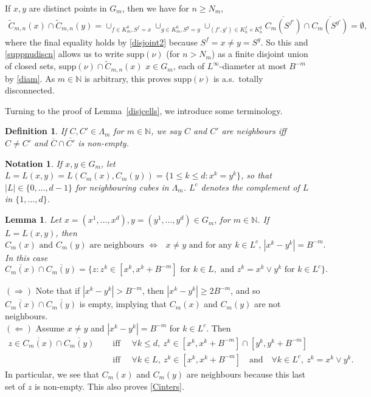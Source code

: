 \documentclass[12pt]{article}
\makeatletter
\renewenvironment{proof}[1][\proofname]{%
\par\pushQED{\qed}\normalfont%
\topsep6\p@\@plus6\p@\relax
\trivlist\item[\hskip\labelsep\bfseries#1\@addpunct{.}]%
\ignorespaces
}{%
\popQED\endtrivlist\@endpefalse
}
\numberwithin{theorem}{section}
\newtheorem{lemma}[theorem]{Lemma}
\theoremstyle{def}
\newtheorem*{definition}{Definition}
\newtheorem*{notation}{Notation}
\numberwithin{equation}{section}
\newcommand{\N}{\mathbb{N}}
\newcommand{\supp}{\mathrm{supp}}
\makeatother
\begin{document}
\begin{proof}[Proof of Theorem~\ref{thm:totdisc}]
If $x,y$ are distinct points in $G_m$, then we have for $n\ge N_m$,
\begin{align*}\widetilde C_{m,n}(x)\cap\widetilde C_{m,n}(y)=\cup_{f\in K_m^0,S^f=x}\cup_{g\in K^0_m,S^g=y}\cup_{(f',g')\in K^f_n\times K^g_n} \overline{C_m(S^{f'})}\cap\overline{C_m(S^{g'})}=\emptyset,
\end{align*}
where the final equality holds by \eqref{disjoint2} because $S^f=x\neq y=S^g$. So this and \eqref{suppnudiscn} allows us to write $\supp(\nu)$ (for $n>N_m$) as a finite disjoint union of closed sets, $\supp(\nu)\cap \widetilde C_{m,n}(x)$ $x\in G_m$, each of $L^\infty$-diameter at most $B^{-m}$ by \eqref{diam}.  
As $m\in\N$ is arbitrary, this proves $\supp(\nu)$ is a.s.\ totally disconnected.
\end{proof} 

Turning to the proof of Lemma~\ref{disjcells}, we introduce some terminology. 

\begin{definition} If $C,C'\in \Lambda_m$ for $m\in\N$, we say $C$ and $C'$ are neighbours iff $C\neq C'$ and $\overline{C}\cap\overline{C'}$ is non-empty.
\end{definition} 

\begin{notation}  If $x,y\in G_m$, let $L=L(x,y)=L(C_m(x),C_m(y))=\{1\le k\le d:x^k=y^k\}$, so that $|L|\in\{0,\dots,d-1\}$ for neighbouring cubes in $\Lambda_m$. $L^c$ denotes the complement of $L$ in $\{1,\dots,d\}$.
\end{notation}

\begin{lemma}\label{ellneighb} Let $x=(x^1,\dots,x^d), y=(y^1,\dots,y^d)\in G_m$, for $m\in\N$. If $L=L(x,y)$, then
\[\text{$C_m(x)$ and $C_m(y)$ are neighbours $\iff$ $x\neq y$ and for any $k\in L^c$, $|x^k-y^k|=B^{-m}$.}\]
In this case
\begin{equation}\label{Cinters}\overline{C_m(x)}\cap\overline{C_m(y)}=\{z:z^k\in[x^k,x^k+B^{-m}]\text{ for }k\in L,\text{ and }z^k=x^k\vee y^k\text{ for }k\in L^c\}.
\end{equation}
\end{lemma}
\begin{proof}
$(\Rightarrow)$ Note that if $|x^k-y^k|>B^{-m}$, then $|x^k-y^k|\ge 2B^{-m}$, and so $\overline{C_m(x)}\cap\overline{C_m(y)}$ is empty, implying that $C_m(x)$ and $C_m(y)$ are not neighbours.\\
$(\Leftarrow)$ 
Assume $x\neq y$ and $|x^k-y^k|=B^{-m}$ for $k\in L^c$.  Then %
\begin{align*} z\in \overline{C_m(x)}\cap\overline{C_m(y)}\quad &\text{ iff } \quad \forall k\le d, \ z^k\in[x^k,x^k+B^{-m}]\cap[y^k,y^k+B^{-m}]\\
&\text{ iff } \quad \forall k\in L, \ z^k\in[x^k,x^k+B^{-m}] \quad  \text{and} \quad \forall k\in L^c, \ z^k=x^k\vee y^k.
\end{align*}
In particular, we see that $C_m(x)$ and $C_m(y)$ are neighbours because this last set of $z$ is non-empty. This also proves \eqref{Cinters}.
\end{proof}
\end{document}
